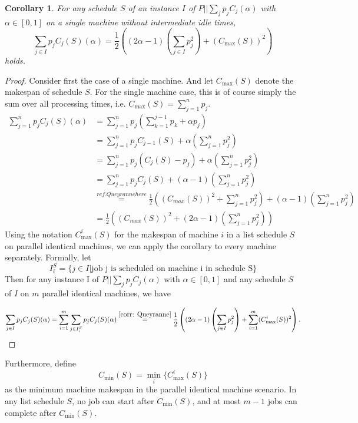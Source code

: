 \documentclass{article}
\newtheorem{corollary}{Corollary}
\newcommand{\Cmax}{C_{\max}}
\newcommand{\Cmin}{C_{\min}}
\begin{document}
\begin{corollary}\label{corr: Queyranne}
For any schedule $S$ of an instance $I$ of $P||\sum_j p_j C_j(\alpha)$ with $\alpha \in [0,1]$ on a single machine without intermediate idle times,
\[
        \sum_{j\in I}p_j C_j(S)(\alpha)
        =
        \frac12\left((2\alpha-1)\left(\sum_{j\in I}p_j^2\right)+(\Cmax(S))^2\right)
\]
holds.
\end{corollary}

\begin{proof}
Consider first the case of a single machine. And let $C_{\max}(S)$ denote the makespan of schedule $S$. For
the single machine case, this is of course simply the sum over all processing times, i.e. $C_{\max}(S)=\sum_{j=1}^n p_j$.
\[
\begin{aligned}
        \sum_{j=1}^n p_jC_j(S)(\alpha)
        &=
        \sum_{j=1}^n p_j\left(\sum_{k=1}^{j-1} p_k +\alpha p_j \right)                       \\
        &=
        \sum_{j=1}^n p_jC_{j-1}(S)+\alpha\left(\sum_{j=1}^n p_j^2  \right)                   \\                 
        &=
        \sum_{j=1}^n p_j(C_j(S)-p_j)+\alpha\left(\sum_{j=1}^n p_j^2  \right)                 \\
        &=
        \sum_{j=1}^n p_jC_j(S)+(\alpha-1)\left(\sum_{j=1}^n p_j^2  \right)                      \\
        &\overset{ref. Queyranne here}{=}
        \frac12\left((C_{max}(S))^2+\sum_{j=1}^n p_j^2\right)+(\alpha-1)\left(\sum_{j=1}^n p_j^2  \right)   \\
        &=
        \frac12\left((C_{max}(S))^2+(2\alpha-1)\left(\sum_{j=1}^n p_j^2  \right) \right)
\end{aligned}
\]
Using the notation $C_{\max}^i(S)$ for the makespan
of machine $i$ in a list schedule $S$ on parallel identical machines, we can
apply the corollary to every machine separately.
Formally, let
\[
I_i^S= \{j\in I| \text{job j is scheduled on machine i in schedule S}\}
\]
Then for any instance I of $P||\sum_j p_j C_j(\alpha)$ with $\alpha \in [0,1]$ and any schedule $S$ of $I$ on $m$ parallel identical machines, we have

\[
        \sum_{j\in I}p_j C_j(S)(\alpha)
        =
        \sum_{i=1}^m \sum_{j\in I_i^S}p_j C_j(S)(\alpha)
        \overset{\ref{corr: Queyranne}}{=}
        \frac12\left((2\alpha-1)\left(\sum_{j\in I}p_j^2\right)+\sum_{i=1}^m (C_{\max}^i(S))^2\right).
\]
\end{proof}
Furthermore, define
\[
        \Cmin(S)=\min_i\{C_{\max}^i(S)\}
\]
as the minimum machine makespan in the parallel identical machine scenario.
In any list schedule $S$, no job can start after $\Cmin(S)$, and at most
$m-1$ jobs can complete after $\Cmin(S)$.
\end{document}
